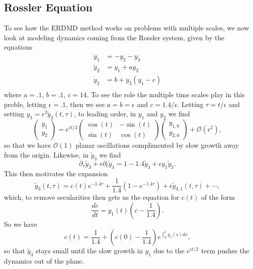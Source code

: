 \documentclass[a4paper,11pt]{article}
\newcommand{\p}{\partial}
\begin{document}
\subsection*{Rossler Equation}

To see how the ERDMD method works on problems with multiple scales, we now look at modeling dynamics coming from the Rossler system, given by the equations
\begin{align*}
\dot{y}_{1} & = -y_{2} - y_{3}\\
\dot{y}_{2} & = y_{1} + ay_{2}\\
\dot{y}_{3} & = b + y_{3}(y_{1}-c)\\
\end{align*} 
where $a=.1$, $b=.1$, $c=14$.  To see the role the multiple time scales play in this proble, letting $\epsilon=.1$, then we see $a=b=\epsilon$ and $c=1.4/\epsilon$.  Letting $\tau = t/\epsilon$ and setting $y_{3} = \epsilon^{2}\tilde{y}_{3}(t,\tau)$, to leading order, in $y_{1}$ and $y_{2}$ we find 
\[
\begin{pmatrix}y_{1} \\ y_{2}\end{pmatrix} = e^{\epsilon t/2}\begin{pmatrix}\cos(t) & -\sin(t) \\ \sin(t) & \cos(t)\end{pmatrix}\begin{pmatrix}y_{1,0} \\ y_{2,0}\end{pmatrix} + \mathcal{O}(\epsilon^{2}),
\]
so that we have $\mathcal{O}(1)$ planar oscillations complimented by slow growth away from the origin.  Likewise, in $\tilde{y}_{3}$ we find 
\[
\p_{\tau}\tilde{y}_{3} + \epsilon \p_{t}\tilde{y}_{3} = 1 - 1.4\tilde{y}_{3} + \epsilon y_{1}\tilde{y}_{3}.
\]
This then motivates the expansion 
\[
\tilde{y}_{3}(t,\tau) = c(t) e^{-1.4\tau} + \frac{1}{1.4}\left(1-e^{-1.4\tau} \right) + \epsilon \tilde{y}_{3,1}(t,\tau) + \cdots, 
\]
which, to remove secularities then gets us the equation for $c(t)$ of the form
\[
\frac{dc}{dt} = y_{1}(t)\left(c - \frac{1}{1.4} \right).
\]
So we have 
\[
c(t) = \frac{1}{1.4} + \left(c(0)-\frac{1}{1.4}\right)e^{\int_{0}^{t}y_{1}(s)ds},
\]
so that $\tilde{y}_{3}$ stays small until the slow growth in $y_{1}$ due to the $e^{\epsilon t/2}$ term pushes the dynamics out of the plane.  
\end{document}
